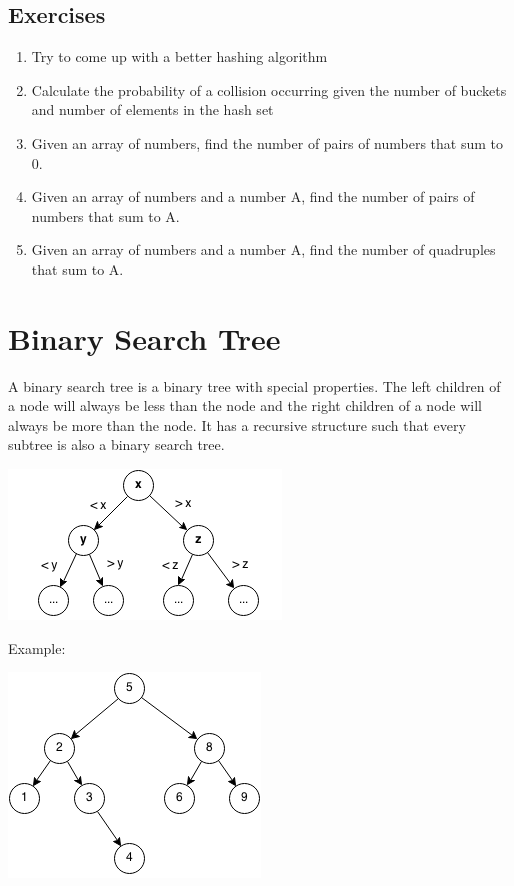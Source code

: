 \documentclass[11pt,oneside]{book}
\makeatletter
\def\maxwidth#1{\ifdim\Gin@nat@width>#1 #1\else\Gin@nat@width\fi}
\makeatother
\begin{document}
\subsection{Exercises}

\begin{enumerate}
\item Try to come up with a better hashing algorithm
\item Calculate the probability of a collision occurring given the number of buckets and number of elements in the hash set
\item Given an array of numbers, find the number of pairs of numbers that sum to 0.
\item Given an array of numbers and a number A, find the number of pairs of numbers that sum to A.
\item Given an array of numbers and a number A, find the number of quadruples that sum to A.
\end{enumerate}

        \section{ Binary Search Tree }
        

A binary search tree is a  binary tree with special properties. The left children of a node will always be less than the node and the right children of a node will always be more than the node. It has a recursive structure such that every subtree is also a binary search tree.

\vspace{5px}\includegraphics[width=\maxwidth{\textwidth}]{bstcompare.png}

Example:

\vspace{5px}\includegraphics[width=\maxwidth{\textwidth}]{bst.png}
\end{document}

